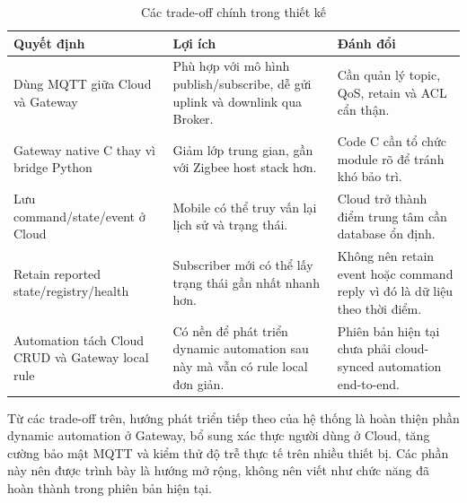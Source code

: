 \begin{table}[H]
    \centering
    \caption{Các trade-off chính trong thiết kế}
    \label{tab:ch3-tradeoffs}
    \footnotesize
    \setlength{\tabcolsep}{3pt}
    \begin{tabular}{|>{\raggedright\arraybackslash}p{3.9cm}|>{\raggedright\arraybackslash}p{5.2cm}|>{\raggedright\arraybackslash}p{4.8cm}|}
        \hline
        \textbf{Quyết định} & \textbf{Lợi ích} & \textbf{Đánh đổi} \\
        \hline
        Dùng MQTT giữa Cloud và Gateway & Phù hợp với mô hình publish/subscribe, dễ gửi uplink và downlink qua Broker. & Cần quản lý topic, QoS, retain và ACL cẩn thận. \\
        \hline
        Gateway native C thay vì bridge Python & Giảm lớp trung gian, gần với Zigbee host stack hơn. & Code C cần tổ chức module rõ để tránh khó bảo trì. \\
        \hline
        Lưu command/state/event ở Cloud & Mobile có thể truy vấn lại lịch sử và trạng thái. & Cloud trở thành điểm trung tâm cần database ổn định. \\
        \hline
        Retain reported state/registry/health & Subscriber mới có thể lấy trạng thái gần nhất nhanh hơn. & Không nên retain event hoặc command reply vì đó là dữ liệu theo thời điểm. \\
        \hline
        Automation tách Cloud CRUD và Gateway local rule & Có nền để phát triển dynamic automation sau này mà vẫn có rule local đơn giản. & Phiên bản hiện tại chưa phải cloud-synced automation end-to-end. \\
        \hline
    \end{tabular}
    \setlength{\tabcolsep}{6pt}
\end{table}

Từ các trade-off trên, hướng phát triển tiếp theo của hệ thống là hoàn thiện phần dynamic automation ở Gateway, bổ sung xác thực người dùng ở Cloud, tăng cường bảo mật MQTT và kiểm thử độ trễ thực tế trên nhiều thiết bị. Các phần này nên được trình bày là hướng mở rộng, không nên viết như chức năng đã hoàn thành trong phiên bản hiện tại.

